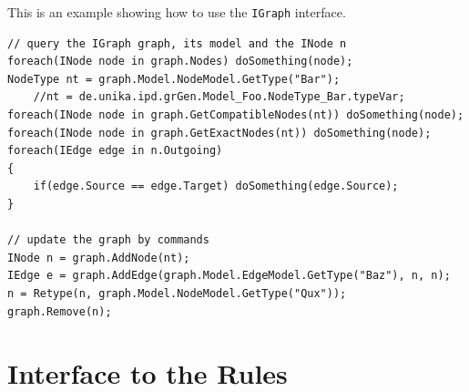 \begin{example}
This is an example showing how to use the \texttt{IGraph} interface.
\begin{verbatim}
// query the IGraph graph, its model and the INode n
foreach(INode node in graph.Nodes) doSomething(node);
NodeType nt = graph.Model.NodeModel.GetType("Bar");
    //nt = de.unika.ipd.grGen.Model_Foo.NodeType_Bar.typeVar;
foreach(INode node in graph.GetCompatibleNodes(nt)) doSomething(node);
foreach(INode node in graph.GetExactNodes(nt)) doSomething(node);
foreach(IEdge edge in n.Outgoing)
{
    if(edge.Source == edge.Target) doSomething(edge.Source);
}

// update the graph by commands
INode n = graph.AddNode(nt);
IEdge e = graph.AddEdge(graph.Model.EdgeModel.GetType("Baz"), n, n);
n = Retype(n, graph.Model.NodeModel.GetType("Qux"));
graph.Remove(n);
\end{verbatim}
\end{example}



\section{Interface to the Rules}

